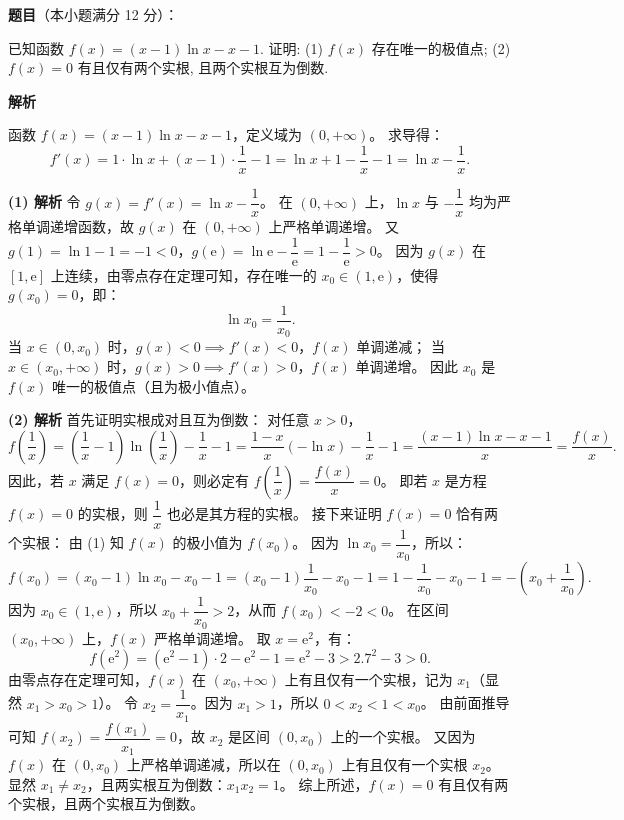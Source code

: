 \begin{answer}

\gkanswer{答案（2）：$b = 4$；$a$ 的取值范围为 $[4\sqrt{2}, +\infty)$}

\end{answer}
\begin{answer}

\textbf{题目}（本小题满分 12 分）：

已知函数 $f(x) = (x - 1)\ln x - x - 1$. 证明:
(1) $f(x)$ 存在唯一的极值点;
(2) $f(x) = 0$ 有且仅有两个实根, 且两个实根互为倒数.

\textbf{解析}

函数 $f(x) = (x - 1)\ln x - x - 1$，定义域为 $(0, +\infty)$。
求导得：
\nopagebreak[4]
\[f'(x) = 1 \cdot \ln x + (x - 1) \cdot \frac{1}{x} - 1 = \ln x + 1 - \frac{1}{x} - 1 = \ln x - \frac{1}{x}.\]

\textbf{(1) 解析}
令 $g(x) = f'(x) = \ln x - \dfrac{1}{x}$。
在 $(0, +\infty)$ 上，$\ln x$ 与 $-\dfrac{1}{x}$ 均为严格单调递增函数，故 $g(x)$ 在 $(0, +\infty)$ 上严格单调递增。
又 $g(1) = \ln 1 - 1 = -1 < 0$，$g(\mathrm{e}) = \ln\mathrm{e} - \dfrac{1}{\mathrm{e}} = 1 - \dfrac{1}{\mathrm{e}} > 0$。
因为 $g(x)$ 在 $[1, \mathrm{e}]$ 上连续，由零点存在定理可知，存在唯一的 $x_0 \in (1, \mathrm{e})$，使得 $g(x_0) = 0$，即：
\nopagebreak[4]
\[\ln x_0 = \frac{1}{x_0}.\]
当 $x \in (0, x_0)$ 时，$g(x) < 0 \implies f'(x) < 0$，$f(x)$ 单调递减；
当 $x \in (x_0, +\infty)$ 时，$g(x) > 0 \implies f'(x) > 0$，$f(x)$ 单调递增。
因此 $x_0$ 是 $f(x)$ 唯一的极值点（且为极小值点）。

\textbf{(2) 解析}
首先证明实根成对且互为倒数：
对任意 $x > 0$，
\nopagebreak[4]
\[f\left(\frac{1}{x}\right) = \left(\frac{1}{x} - 1\right)\ln\left(\frac{1}{x}\right) - \frac{1}{x} - 1 = \frac{1 - x}{x}(-\ln x) - \frac{1}{x} - 1 = \frac{(x - 1)\ln x - x - 1}{x} = \frac{f(x)}{x}.\]
因此，若 $x$ 满足 $f(x) = 0$，则必定有 $f\left(\dfrac{1}{x}\right) = \dfrac{f(x)}{x} = 0$。
即若 $x$ 是方程 $f(x) = 0$ 的实根，则 $\dfrac{1}{x}$ 也必是其方程的实根。
接下来证明 $f(x) = 0$ 恰有两个实根：
由 (1) 知 $f(x)$ 的极小值为 $f(x_0)$。
因为 $\ln x_0 = \dfrac{1}{x_0}$，所以：
\nopagebreak[4]
\[f(x_0) = (x_0 - 1)\ln x_0 - x_0 - 1 = (x_0 - 1)\frac{1}{x_0} - x_0 - 1 = 1 - \frac{1}{x_0} - x_0 - 1 = -\left(x_0 + \frac{1}{x_0}\right).\]
因为 $x_0 \in (1, \mathrm{e})$，所以 $x_0 + \dfrac{1}{x_0} > 2$，从而 $f(x_0) < -2 < 0$。
在区间 $(x_0, +\infty)$ 上，$f(x)$ 严格单调递增。
取 $x = \mathrm{e}^2$，有：
\nopagebreak[4]
\[f(\mathrm{e}^2) = (\mathrm{e}^2 - 1) \cdot 2 - \mathrm{e}^2 - 1 = \mathrm{e}^2 - 3 > 2.7^2 - 3 > 0.\]
由零点存在定理可知，$f(x)$ 在 $(x_0, +\infty)$ 上有且仅有一个实根，记为 $x_1$（显然 $x_1 > x_0 > 1$）。
令 $x_2 = \dfrac{1}{x_1}$。因为 $x_1 > 1$，所以 $0 < x_2 < 1 < x_0$。
由前面推导可知 $f(x_2) = \dfrac{f(x_1)}{x_1} = 0$，故 $x_2$ 是区间 $(0, x_0)$ 上的一个实根。
又因为 $f(x)$ 在 $(0, x_0)$ 上严格单调递减，所以在 $(0, x_0)$ 上有且仅有一个实根 $x_2$。
显然 $x_1 \neq x_2$，且两实根互为倒数：$x_1 x_2 = 1$。
综上所述，$f(x) = 0$ 有且仅有两个实根，且两个实根互为倒数。


\end{answer}
